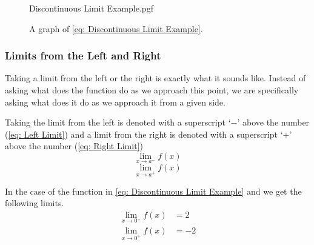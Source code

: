 \documentclass[main.tex]{subfiles}
\begin{document}
                    \begin{figure}[!h]
                        \centering
                        \scalebox{0.7}
                        {
                            \begin{adjustbox}{clip,trim=15mm 10mm 15mm 10mm}
                                {{Discontinuous Limit Example.pgf}}
                            \end{adjustbox}
                        }
    
                        \caption{A graph of \eqref{eq: Discontinuous Limit Example}.}
                        \label{fig: Discontinuous Limit Example Diagram}
                    \end{figure}
    
                
                \subsubsection{Limits from the Left and Right}
                    \label{subsubsec: Limits from the Left and Right}
    
                    Taking a limit from the left or the right is exactly what it sounds like. Instead of asking what does the function do as we approach this point, we are specifically asking what does it do as we approach it from a given side.
    
                    Taking the limit from the left is denoted with a superscript `$-$' above the number (\eqref{eq: Left Limit}) and a limit from the right is denoted with a superscript `$+$' above the number (\eqref{eq: Right Limit})
                    \begin{equation}
                        \lim_{x\to a^-} f(x)
                        \label{eq: Left Limit}
                    \end{equation}
                    \begin{equation}
                        \lim_{x\to a^+} f(x)
                        \label{eq: Right Limit}
                    \end{equation}
    
                    In the case of the function in \eqref{eq: Discontinuous Limit Example} and  we get the following limits.
                    \begin{align*}
                        \lim_{x\to 0^-} f(x) &= 2\\[-1em]
                        \lim_{x\to 0^+} f(x) &= -2
                    \end{align*}
\end{document}
